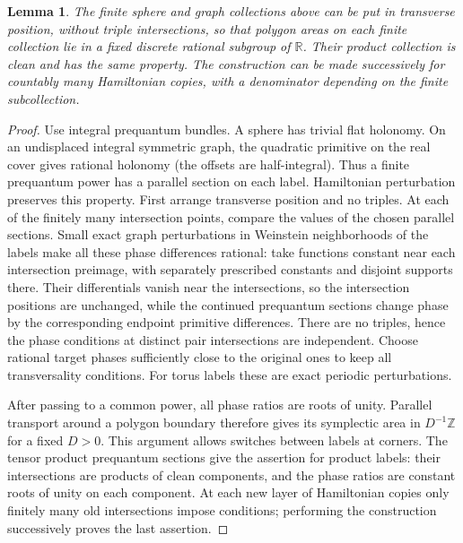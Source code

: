 \documentclass[11pt]{article}
\numberwithin{equation}{section}
\newtheorem{lemma}[theorem]{Lemma}
\theoremstyle{definition}
\theoremstyle{remark}
\newcommand{\R}{\mathbb R}
\newcommand{\Z}{\mathbb Z}
\begin{document}
\begin{lemma}\label{lem:rational-label-areas}
The finite sphere and graph collections above can be put in transverse
position, without triple intersections, so that polygon areas on
each finite collection lie in a fixed discrete rational subgroup of
$\R$.  Their product collection is clean and has the same property.
The construction can be made successively for countably many
Hamiltonian copies, with a denominator depending on the finite
subcollection.
\end{lemma}
\begin{proof}
Use integral prequantum bundles.  A sphere has trivial flat holonomy.
On an undisplaced integral symmetric graph, the quadratic primitive
on the real cover gives rational holonomy (the offsets are
half-integral).  Thus a finite prequantum power has a parallel section
on each label.  Hamiltonian perturbation preserves this property.
First arrange transverse position and no triples.  At each of the
finitely many intersection points, compare the values of the chosen
parallel sections.  Small exact graph perturbations in Weinstein
neighborhoods of the labels make all these
phase differences rational: take functions constant near each
intersection preimage, with separately prescribed constants and
disjoint supports there.  Their differentials vanish near the
intersections, so the intersection positions are unchanged, while
the continued prequantum sections change phase by the corresponding
endpoint primitive differences.  There are no triples, hence the
phase conditions at distinct pair intersections are independent.
Choose rational target phases sufficiently close to the original
ones to keep all transversality conditions.  For torus labels these
are exact periodic perturbations.

After passing to a common power, all phase ratios are roots of unity.
Parallel transport around a polygon boundary therefore gives its
symplectic area in $D^{-1}\Z$ for a fixed $D>0$.  This argument allows
switches between labels at corners.  The tensor product prequantum
sections give the assertion for product labels: their intersections
are products of clean components, and the phase ratios are constant
roots of unity on each component.  At each new layer of Hamiltonian
copies only finitely many old intersections impose conditions;
performing the construction successively proves the last assertion.
\end{proof}
\end{document}
